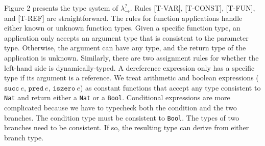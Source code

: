 Figure 2 presents the type system of $\lambda ^? _{\rightarrow}$. Rules 
{\scriptsize{[T-VAR]}}, {\scriptsize{[T-CONST]}}, {\scriptsize{[T-FUN]}}, 
and {\scriptsize{[T-REF]}}  
are straightforward. The rules for function applications handle either 
known or unknown function types. Given a specific function type, an 
application only accepts an argument type that is consistent to the 
parameter type. Otherwise, the argument can have any type, and the return 
type of the application is unknown. Similarly, there are two assignment 
rules for whether the left-hand side is dynamically-typed. 
A dereference expression only has a specific type if its argument is a 
reference.  We treat arithmetic 
and boolean expressions ($\texttt{succ} \: e$, $\texttt{pred} \: e$, $\texttt{iszero} \: e$) 
as constant functions that accept any type consistent to \texttt{Nat} and 
return either a \texttt{Nat} or a \texttt{Bool}. Conditional expressions are more 
complicated because we have to typecheck both the condition and the two 
branches. The condition type must be consistent to 
\texttt{Bool}. The types of two branches need to be consistent. If so, the 
resulting type can derive from either branch type.
